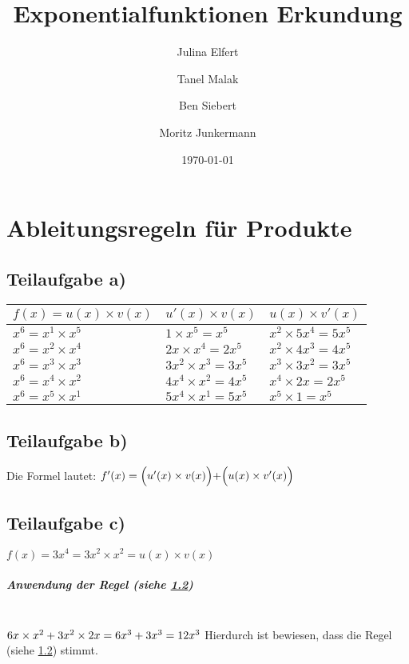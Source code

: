 \documentclass[11pt, a4paper]{report}
\begin{document}
	\bsremovechaptertitle
	\title{Exponentialfunktionen Erkundung}
	\author{Julina Elfert \and Tanel Malak \and Ben Siebert \and Moritz Junkermann}
	\date{\today}
	\maketitle
	\tableofcontents
	\chapter{Ableitungsregeln für Produkte}
	\section{Teilaufgabe a)}
	\begin{tabularx}{\textwidth}{|X|X|X|}
	 \hline
	 $f(x) = u(x) \times v(x)$ & $u'(x) \times v(x)$ & $u(x) \times v'(x)$ \\
	 \hline
	 $x^6 = x^1 \times x ^5$ & $1 \times x^5 = x^5$ & $x^2 \times 5x^4 = 5x^5$ \\
	 \hline
	 $x^6 = x^2 \times x^4$ & $2x \times x^4 = 2x^5$ & $x^2 \times 4x^3 = 4x^5$ \\
	 \hline
	 $x^6 = x^3 \times x^3$ & $3x^2 \times x^3 = 3x^5$ & $x^3 \times 3x^2 = 3x^5$ \\
	 \hline
	 $x^6 = x^4 \times x^2$ & $4x^4 \times x^2 = 4x^5$ & $x^4 \times 2x = 2x^5$ \\
	 \hline
	 $x^6 = x^5 \times x^1$ & $5x^4 \times x^1 = 5x^5$ & $x^5 \times 1 = x^5$ \\
	 \hline
	\end{tabularx}
	\section{Teilaufgabe b)}\label{sec:b_rule}
	Die Formel lautet: $f'(x) = \Bigl(u'(x) \times v(x)\Bigl) + \Bigl(u(x) \times v'(x)\Bigl)$
	\section{Teilaufgabe c)}
	$f(x) = 3x^4 = 3x^2 \times x^2 = u(x) \times v(x)$ \\
	\paragraph{Anwendung der Regel (siehe \ref{sec:b_rule})} \mbox{} \\
	$
	6x \times x^2 + 3x^2 \times 2x \\
	= 6x^3 + 3x^3 \\
	= 12x^3 \\
	$
	Hierdurch ist bewiesen, dass die Regel (siehe \ref{sec:b_rule}) stimmt.
	
\end{document}

